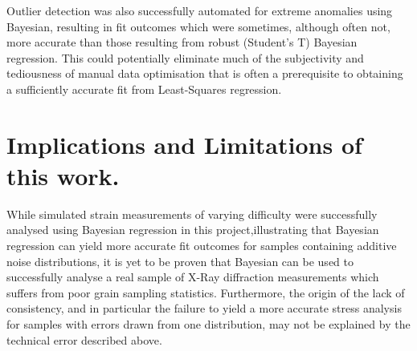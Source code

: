 Outlier detection was also successfully automated for extreme anomalies using Bayesian, resulting in fit outcomes which were sometimes, although often not, more accurate than those resulting from robust (Student's T)  Bayesian regression. This could potentially eliminate much of the subjectivity and tediousness of manual data optimisation that is often a prerequisite to obtaining a sufficiently accurate fit from Least-Squares regression. 

\section{Implications and Limitations of this work.}
\label{sec:sec01}

While simulated strain measurements of varying difficulty were successfully analysed using Bayesian regression in this project,illustrating that Bayesian regression can yield more accurate fit outcomes for samples containing additive noise distributions, it is yet to be proven that Bayesian can be used to successfully analyse a real sample of X-Ray diffraction measurements which suffers from poor grain sampling statistics. Furthermore, the origin of the lack of consistency, and in particular the failure to yield a more accurate stress analysis for samples with errors drawn from one distribution, may not be explained by the technical error described above. 
